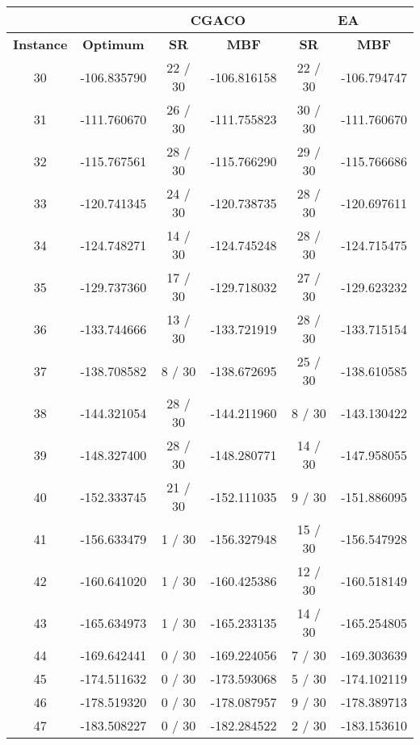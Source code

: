 		\begin{table}[!htdp]
				\label{tab:cgaco_vs_ea}
				\begin{center}
					\begin{tabular}{| c | c | c | c | c | c |}
						\hline
						\multicolumn{2}{|c|}{} & \multicolumn{2}{c|}{\textbf{CGACO}} & \multicolumn{2}{c|}{\textbf{EA}}\\ \hline
						\textbf{Instance} & \textbf{Optimum} & \textbf{SR} & \textbf{MBF} & \textbf{SR} & \textbf{MBF} \\ \hline
						30 & -106.835790 & 22 / 30 & -106.816158 & 22 / 30 & -106.794747 \\ \hline
						31 & -111.760670 & 26 / 30 & -111.755823 & 30 / 30 & -111.760670 \\ \hline
						32 & -115.767561 & 28 / 30 & -115.766290 & 29 / 30 & -115.766686 \\ \hline
						33 & -120.741345 & 24 / 30 & -120.738735 & 28 / 30 & -120.697611 \\ \hline
						34 & -124.748271 & 14 / 30 & -124.745248 & 28 / 30 & -124.715475 \\ \hline
						35 & -129.737360 & 17 / 30 & -129.718032 & 27 / 30 & -129.623232 \\ \hline
						36 & -133.744666 & 13 / 30 & -133.721919 & 28 / 30 & -133.715154 \\ \hline
						37 & -138.708582 & 8 / 30 & -138.672695 & 25 / 30 & -138.610585 \\ \hline
						38 & -144.321054 & 28 / 30 & -144.211960 & 8 / 30 & -143.130422 \\ \hline
						39 & -148.327400 & 28 / 30 & -148.280771 & 14 / 30 & -147.958055 \\ \hline
						40 & -152.333745 & 21 / 30 & -152.111035 & 9 / 30 & -151.886095 \\ \hline
						41 & -156.633479 & 1 / 30 & -156.327948 & 15 / 30 & -156.547928 \\ \hline
						42 & -160.641020 & 1 / 30 & -160.425386 & 12 / 30 & -160.518149 \\ \hline
						43 & -165.634973 & 1 / 30 & -165.233135 & 14 / 30 & -165.254805 \\ \hline
						44 & -169.642441 & 0 / 30 & -169.224056 & 7 / 30 & -169.303639 \\ \hline
						45 & -174.511632 & 0 / 30 & -173.593068 & 5 / 30 & -174.102119 \\ \hline
						46 & -178.519320 & 0 / 30 & -178.087957 & 9 / 30 & -178.389713 \\ \hline
						47 & -183.508227 & 0 / 30 & -182.284522 & 2 / 30 & -183.153610 \\ \hline

\end{tabular}
\end{center}
\end{table}
